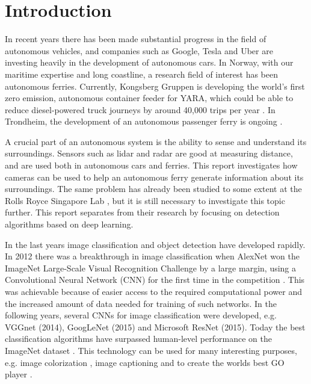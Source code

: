 
\chapter{Introduction}

In recent years there has been made substantial progress in the field of autonomous vehicles, and companies such as Google, Tesla and Uber are investing heavily in the development of autonomous cars. In Norway, with our maritime expertise and long coastline, a research field of interest has been autonomous ferries. Currently, Kongsberg Gruppen is developing the world's first zero emission, autonomous container feeder for YARA, which could be able to reduce diesel-powered truck journeys by around 40,000 trips per year \citep{yara}. In Trondheim, the development of an autonomous passenger ferry is ongoing \citep{autonom_trd}. 

\vspace{3mm}

A crucial part of an autonomous system is the ability to sense and understand its surroundings. Sensors such as lidar and radar are good at measuring distance, and are used both in autonomous cars and ferries. This report investigates how cameras can be used to help an autonomous ferry generate information about its surroundings. The same problem has already been studied to some extent at the Rolls Royce Singapore Lab \citep{Prasad2016} \citep{Prasad2016a}, but it is still necessary to investigate this topic further. This report separates from their research by focusing on detection algorithms based on deep learning. 

\vspace{3mm}

In the last years image classification and object detection have developed rapidly. In 2012 there was a breakthrough in image classification when AlexNet won the ImageNet Large-Scale Visual Recognition Challenge by a large margin, using a Convolutional Neural Network (CNN) for the first time in the competition \citep{Krizhevsky2012}. This was achievable because of easier access to the required computational power and the increased amount of data needed for training of such networks. In the following years, several CNNs for image classification were developed, e.g. VGGnet (2014), GoogLeNet (2015) and Microsoft ResNet (2015). Today the best classification algorithms have surpassed human-level performance on the ImageNet dataset \citep{He}. This technology can be used for many interesting purposes, e.g. image colorization \citep{Zhang2016}, image captioning \citep{Karpathy2016} and to create the worlds best GO player \citep{Silver2016}.

